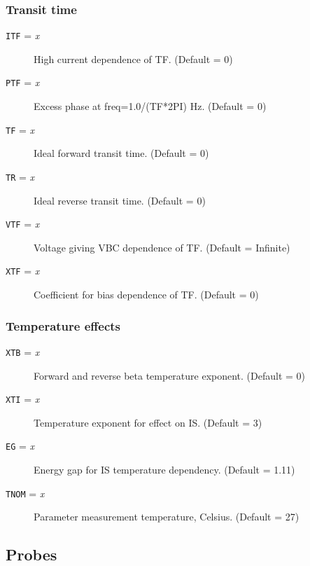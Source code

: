 \subsubsection{Transit time}

\begin{description}

\item[{\tt ITF} = {\it x}]
High current dependence of TF.  (Default = 0)

\item[{\tt PTF} = {\it x}]
Excess phase at freq=1.0/(TF*2PI) Hz.  (Default = 0)

\item[{\tt TF} = {\it x}]
Ideal forward transit time.  (Default = 0)

\item[{\tt TR} = {\it x}]
Ideal reverse transit time.  (Default = 0)

\item[{\tt VTF} = {\it x}]
Voltage giving VBC dependence of TF.  (Default = Infinite)

\item[{\tt XTF} = {\it x}]
Coefficient for bias dependence of TF.  (Default = 0)

\end{description}

\subsubsection{Temperature effects}

\begin{description}

\item[{\tt XTB} = {\it x}]
Forward and reverse beta temperature exponent.  (Default = 0)

\item[{\tt XTI} = {\it x}]
Temperature exponent for effect on IS.  (Default = 3)

\item[{\tt EG} = {\it x}]
Energy gap for IS temperature dependency.  (Default = 1.11)

\item[{\tt TNOM} = {\it x}]
Parameter measurement temperature, Celsius.  (Default = 27)

\end{description}
\subsection{Probes}

